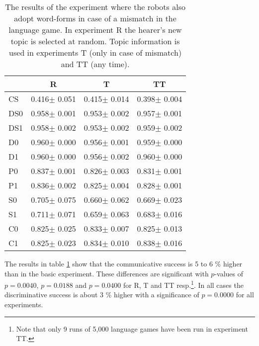 \begin{table}
\centering
\begin{tabular}{||l|c|c|c||}
\hline\hline
        &       R                       &       T                      &       TT     \\\hline
CS      &          0.416$\pm$      0.051&          0.415$\pm$      0.014&          0.398$\pm$      0.004\\\hline
DS0     &          0.958$\pm$      0.001&          0.953$\pm$      0.002&          0.957$\pm$      0.001\\\hline
DS1     &          0.958$\pm$      0.002&          0.953$\pm$      0.002&          0.959$\pm$      0.002\\\hline
D0      &          0.960$\pm$      0.000&          0.956$\pm$      0.001&          0.959$\pm$      0.000\\\hline
D1      &          0.960$\pm$      0.000&          0.956$\pm$      0.002&          0.960$\pm$      0.000\\\hline
P0      &          0.837$\pm$      0.001&          0.826$\pm$      0.003&          0.831$\pm$      0.001\\\hline
P1      &          0.836$\pm$      0.002&          0.825$\pm$      0.004&          0.828$\pm$      0.001\\\hline
S0      &          0.705$\pm$      0.075&          0.660$\pm$      0.062&          0.669$\pm$      0.023\\\hline
S1      &          0.711$\pm$      0.071&          0.659$\pm$      0.063&          0.683$\pm$      0.016\\\hline
C0      &          0.825$\pm$      0.025&          0.833$\pm$      0.007&          0.825$\pm$      0.013\\\hline
C1      &          0.825$\pm$      0.023&          0.834$\pm$      0.010&          0.838$\pm$      0.016\\\hline
\hline
\end{tabular}
\caption{The results of the experiment where the robots also adopt word-forms in case of a mismatch in the language game. In experiment R the hearer's new topic is selected at random. Topic information is used in experiments T (only in case of mismatch) and TT (any time).}
\label{t:lex:ass}
\end{table}

The results in table \ref{t:lex:ass} show that the communicative success is 5 to 6 \% higher than in the basic experiment. These differences are significant with $p$-values of $p=0.0040$, $p=0.0188$ and $p=0.0400$ for R, T and TT resp.\footnote{Note that only 9 runs of 5,000 language games have been run in experiment TT.}. In all cases the discriminative success is about 3 \% higher with a significance of $p=0.0000$ for all experiments.

